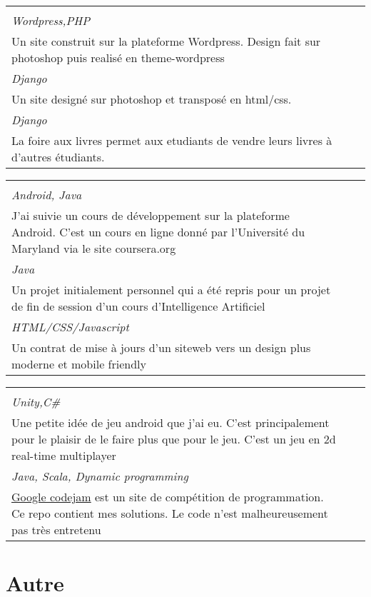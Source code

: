 \documentclass[a4paper,10pt]{extarticle}
\newcommand{\cvboxitem}[5]{}
\renewcommand{\cvboxitem}[5]{%
	\begin{minipage}[t]{\linewidth}
	
	$\bullet$ \textbf{#1}
	\ifthenelse{\equal{#2}{}}{}{, {\slshape #2}}\par%
	\raggedright{\scriptsize\href{#3}{#3}}\\
	{\small\slshape\color{Bittersweet} {#4}}\vspace{0.2em}\\
	{#5}

	\end{minipage}
	
}
\newcommand{\cvtriplebox}[3]{}
\renewcommand{\cvtriplebox}[3]{
\begin{tabular*}{\linewidth}{  
                   p{\dimexpr 0.33\linewidth-1\tabcolsep } 
                   p{\dimexpr 0.33\linewidth-1\tabcolsep }  
                   p{\dimexpr 0.33\linewidth-1\tabcolsep } 
                   } 
{#1}&{#2}&{#3}\tabularnewline
\end{tabular*}
}
\begin{document}
\cvtriplebox
{\cvboxitem{Site web}{abandonné}{www.courspiano.ca}{Wordpress,PHP}
{Un site construit sur la plateforme Wordpress. Design fait sur photoshop puis realisé en theme-wordpress}}
{\cvboxitem{Site web}{abandonné}{http://coursmusique.codefaction.webfactional.com}{Django}
{Un site designé sur photoshop et transposé en html/css.}}
{\cvboxitem{Encefal}{projet en collaboration}{http://foireauxlivres.uqam.ca/}{Django}
{La foire aux livres permet aux etudiants de vendre leurs livres à d'autres étudiants.}}

\cvtriplebox
{\cvboxitem{Programming Mobile Applications for Android Handheld Systems}{}{https://class.coursera.org/android-001}{Android, Java}
{J'ai suivie un cours de développement sur la plateforme Android. C'est un cours en ligne donné par l'Université du Maryland via le site coursera.org}
}
{\cvboxitem{MineSweeper AI}{}{https://github.com/GitMyCode/Minesweeper-AI}{Java}
{Un projet initialement personnel qui a été repris pour un projet de fin de session d'un cours d'Intelligence Artificiel}
}
{
\cvboxitem{Site Web}{contrat}{http://gitmycode.github.io/avocatmontreal/}{ HTML/CSS/Javascript}
{Un contrat de mise à jours d'un siteweb vers un design plus moderne et mobile friendly }
}
\cvtriplebox
{\cvboxitem{Android Game}{en cours}{https://github.com/GitMyCode/laser-game}{Unity,C\#}{Une petite idée de jeu android que j'ai eu. C'est principalement pour le plaisir de le faire plus que pour le jeu. C'est un jeu en 2d real-time multiplayer}}
{\cvboxitem{Google Codejam}{}{https://github.com/GitMyCode/code-jam}{Java, Scala, Dynamic programming}
{\href{https://code.google.com/codejam}{Google codejam} est un site de compétition de programmation. Ce repo contient mes solutions. Le code n'est malheureusement pas très entretenu }}

{}



\vspace{-2em}
\section{Autre}\vspace{0em}
\end{document}

